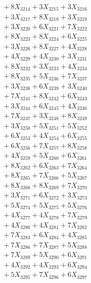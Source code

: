 \documentclass[a4paper,10pt]{article}
\begin{document}
{\begin{align}
&\;  + 8 X_{3214} + 3 X_{3215} + 3 X_{3216} \\[0.3ex]
&\;  + 3 X_{3217} + 8 X_{3218} + 3 X_{3219} \\[0.5ex]\allowbreak
&\;  + 3 X_{3220} + 6 X_{3221} + 7 X_{3222} \\[0.3ex]
&\;  + 8 X_{3223} + 8 X_{3224} + 6 X_{3225} \\[0.3ex]
&\;  + 3 X_{3226} + 8 X_{3227} + 4 X_{3228} \\[0.3ex]
&\;  + 4 X_{3229} + 4 X_{3230} + 3 X_{3231} \\[0.3ex]
&\;  + 8 X_{3232} + 3 X_{3233} + 4 X_{3234} \\[0.3ex]
&\;  + 8 X_{3235} + 5 X_{3236} + 7 X_{3237} \\[0.3ex]
&\;  + 3 X_{3238} + 6 X_{3239} + 3 X_{3240} \\[0.3ex]
&\;  + 7 X_{3241} + 8 X_{3242} + 6 X_{3243} \\[0.3ex]
&\;  + 3 X_{3244} + 6 X_{3245} + 4 X_{3246} \\[0.3ex]
&\;  + 7 X_{3247} + 3 X_{3248} + 8 X_{3249} \\[0.5ex]\allowbreak
&\;  + 3 X_{3250} + 5 X_{3251} + 5 X_{3252} \\[0.3ex]
&\;  + 6 X_{3253} + 4 X_{3254} + 6 X_{3255} \\[0.3ex]
&\;  + 6 X_{3256} + 7 X_{3257} + 8 X_{3258} \\[0.3ex]
&\;  + 4 X_{3259} + 5 X_{3260} + 6 X_{3261} \\[0.3ex]
&\;  + 8 X_{3262} + 6 X_{3263} + 7 X_{3264} \\[0.3ex]
&\;  + 8 X_{3265} + 7 X_{3266} + 5 X_{3267} \\[0.3ex]
&\;  + 8 X_{3268} + 8 X_{3269} + 7 X_{3270} \\[0.3ex]
&\;  + 3 X_{3271} + 6 X_{3272} + 3 X_{3273} \\[0.3ex]
&\;  + 5 X_{3274} + 5 X_{3275} + 5 X_{3276} \\[0.3ex]
&\;  + 4 X_{3277} + 4 X_{3278} + 7 X_{3279} \\[0.5ex]\allowbreak
&\;  + 4 X_{3280} + 4 X_{3281} + 7 X_{3282} \\[0.3ex]
&\;  + 7 X_{3283} + 6 X_{3284} + 4 X_{3285} \\[0.3ex]
&\;  + 7 X_{3286} + 7 X_{3287} + 5 X_{3288} \\[0.3ex]
&\;  + 7 X_{3289} + 5 X_{3290} + 6 X_{3291} \\[0.3ex]
&\;  + 4 X_{3292} + 4 X_{3293} + 6 X_{3294} \\[0.3ex]
&\;  + 5 X_{3295} + 7 X_{3296} + 6 X_{3297} \\[0.3ex]

\end{align}}
\end{document}

